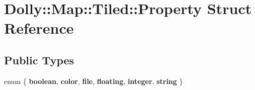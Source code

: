 \hypertarget{struct_dolly_1_1_map_1_1_tiled_1_1_property}{}\section{Dolly\+:\+:Map\+:\+:Tiled\+:\+:Property Struct Reference}
\label{struct_dolly_1_1_map_1_1_tiled_1_1_property}
\subsection*{Public Types}
\begin{DoxyCompactItemize}
\item 
\mbox{\label{struct_dolly_1_1_map_1_1_tiled_1_1_property_adc62376e5c06bdb20e7f1df0c48cd47d}} 
enum \{ \newline
{\bfseries boolean}, 
{\bfseries color}, 
{\bfseries file}, 
{\bfseries floating}, 
\newline
{\bfseries integer}, 
{\bfseries string}
 \}
\end{DoxyCompactItemize}
